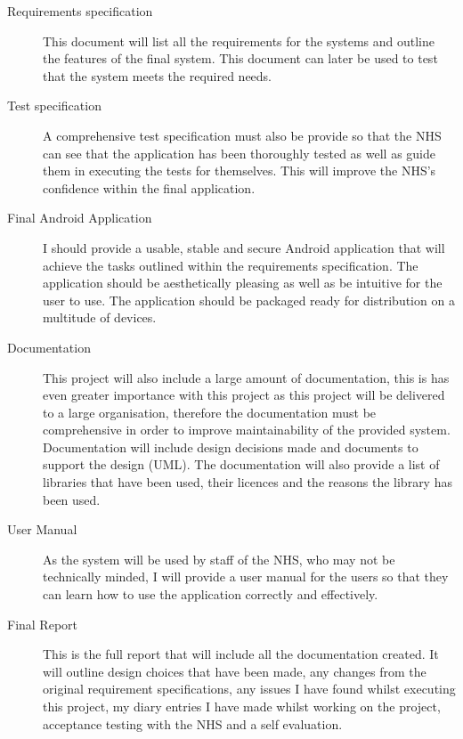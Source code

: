 \documentclass[11pt,fleqn,twoside]{article}
\begin{document}
\begin{description}
  \item[Requirements specification] This document will list all the requirements for the systems and outline the features of the final system. This document can later be used to test that the system meets the required needs.
  \item[Test specification] A comprehensive test specification must also be provide so that the NHS can see that the application has been thoroughly tested as well as guide them in executing the tests for themselves. This will improve the NHS's confidence within the final application.
  \item[Final Android Application] I should provide a usable, stable and secure Android application that will achieve the tasks outlined within the requirements specification. The application should be aesthetically pleasing as well as be intuitive for the user to use. The application should be packaged ready for distribution on a multitude of devices.
  \item[Documentation] This project will also include a large amount of documentation, this is has even greater importance with this project as this project will be delivered to a large organisation, therefore the documentation must be comprehensive in order to improve maintainability of the provided system. Documentation will include design decisions made and documents to support the design (UML). The documentation will also provide a list of libraries that have been used, their licences and the reasons the library has been used.
 \item[User Manual] As the system will be used by staff of the NHS, who may not be technically minded, I will provide a user manual for the users so that they can learn how to use the application correctly and effectively.
 \item[Final Report] This is the full report that will include all the documentation created. It will outline design choices that have been made, any changes from the original requirement specifications, any issues I have found whilst executing this project, my diary entries I have made whilst working on the project, acceptance testing with the NHS and a self evaluation.
\end{description}
\nocite{*} %

\newpage
{} 
\end{document}
